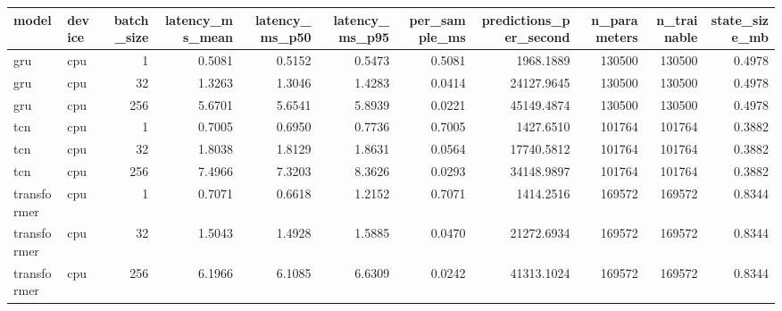 \begin{tabular}{llrrrrrrrrr}
\toprule
model & device & batch\_size & latency\_ms\_mean & latency\_ms\_p50 & latency\_ms\_p95 & per\_sample\_ms & predictions\_per\_second & n\_parameters & n\_trainable & state\_size\_mb \\
\midrule
gru & cpu & 1 & 0.5081 & 0.5152 & 0.5473 & 0.5081 & 1968.1889 & 130500 & 130500 & 0.4978 \\
gru & cpu & 32 & 1.3263 & 1.3046 & 1.4283 & 0.0414 & 24127.9645 & 130500 & 130500 & 0.4978 \\
gru & cpu & 256 & 5.6701 & 5.6541 & 5.8939 & 0.0221 & 45149.4874 & 130500 & 130500 & 0.4978 \\
tcn & cpu & 1 & 0.7005 & 0.6950 & 0.7736 & 0.7005 & 1427.6510 & 101764 & 101764 & 0.3882 \\
tcn & cpu & 32 & 1.8038 & 1.8129 & 1.8631 & 0.0564 & 17740.5812 & 101764 & 101764 & 0.3882 \\
tcn & cpu & 256 & 7.4966 & 7.3203 & 8.3626 & 0.0293 & 34148.9897 & 101764 & 101764 & 0.3882 \\
transformer & cpu & 1 & 0.7071 & 0.6618 & 1.2152 & 0.7071 & 1414.2516 & 169572 & 169572 & 0.8344 \\
transformer & cpu & 32 & 1.5043 & 1.4928 & 1.5885 & 0.0470 & 21272.6934 & 169572 & 169572 & 0.8344 \\
transformer & cpu & 256 & 6.1966 & 6.1085 & 6.6309 & 0.0242 & 41313.1024 & 169572 & 169572 & 0.8344 \\
\bottomrule
\end{tabular}
